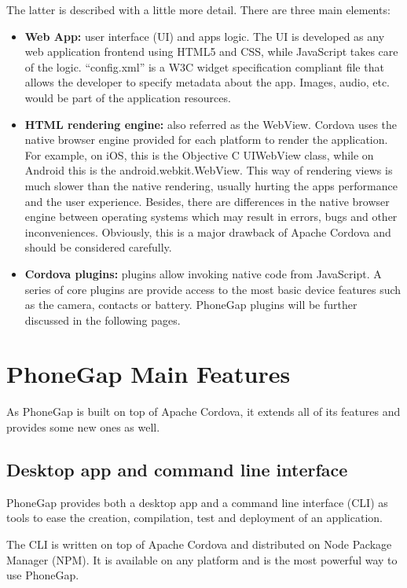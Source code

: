 The latter is described with a little more detail. There are three main elements: 

\begin{itemize} 
 \item \textbf{Web App:} user interface (UI) and apps logic. The UI is developed as any web application frontend using HTML5 and CSS, while JavaScript takes care of the logic. ``config.xml'' is a W3C widget specification compliant file that allows the developer to specify metadata about the app. Images, audio, etc. would be part of the application resources.
 \item \textbf{HTML rendering engine:} also referred as the WebView. Cordova uses the native browser engine provided for each platform to render the application. For example, on iOS, this is the Objective C UIWebView class, while on Android this is the android.webkit.WebView. This way of rendering views is much slower than the native rendering, usually hurting the apps performance and the user experience. Besides, there are differences in the native browser engine between operating systems which may result in errors, bugs and other inconveniences. Obviously, this is a major drawback of Apache Cordova and should be considered carefully. 
 \item \textbf{Cordova plugins:} plugins allow invoking native code from JavaScript. A series of core plugins are provide access to the most basic device features such as the camera, contacts or battery. PhoneGap plugins will be further discussed in the following pages.
\end{itemize}

\section{PhoneGap Main Features}

As PhoneGap is built on top of Apache Cordova, it extends all of its features and provides some new ones as well.

\subsection{Desktop app and command line interface}

PhoneGap provides both a desktop app and a command line interface (CLI) as tools to ease the creation, compilation, test and deployment of an application. 

The CLI is written on top of Apache Cordova and distributed on Node Package Manager (NPM). It is available on any platform and is the most powerful way to use PhoneGap.

